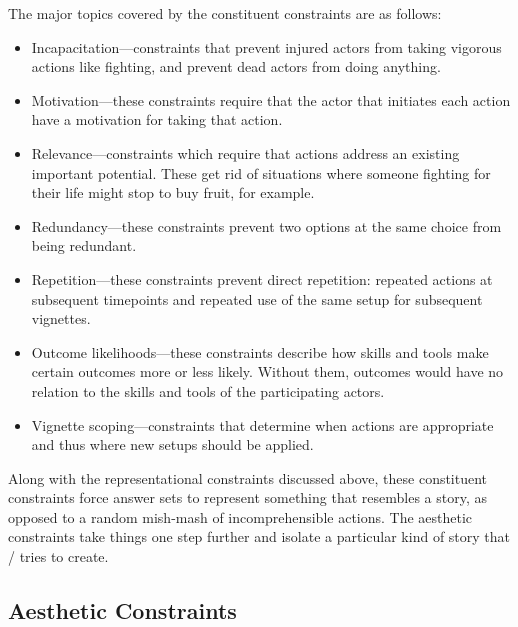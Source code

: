 The major topics covered by the constituent constraints are as follows:
%
\begin{itemize}
  \item Incapacitation---constraints that prevent injured actors from taking vigorous actions like fighting, and prevent dead actors from doing anything.
  \item Motivation---these constraints require that the actor that initiates each action have a motivation for taking that action.
  \item Relevance---constraints which require that actions address an existing important potential. These get rid of situations where someone fighting for their life might stop to buy fruit, for example.
  \item Redundancy---these constraints prevent two options at the same choice from being redundant.
  \item Repetition---these constraints prevent direct repetition: repeated actions at subsequent timepoints and repeated use of the same setup for subsequent vignettes.
  \item Outcome likelihoods---these constraints describe how skills and tools make certain outcomes more or less likely. Without them, outcomes would have no relation to the skills and tools of the participating actors.
  \item Vignette scoping---constraints that determine when  actions are appropriate and thus where new setups should be applied.
\end{itemize}
%
Along with the representational constraints discussed above, these constituent constraints force answer sets to represent something that resembles a story, as opposed to a random mish-mash of incomprehensible actions.
%
The aesthetic constraints take things one step further and isolate a particular kind of story that \dunyazad/ tries to create.

\subsection{Aesthetic Constraints}

